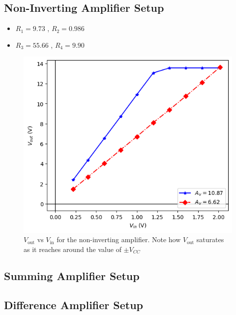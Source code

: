 \subsection{Non-Inverting Amplifier Setup}
    \begin{itemize}
        \item $R_{1}=9.73$ \kohm, $R_{2}=0.986$ \kohm
        \item $R_{3}=55.66$ \kohm, $R_{4}=9.90$ \kohm
    \end{itemize}
    
    \begin{figure}[H]
        \centering
        \includegraphics[width=1\columnwidth]{images/gb.png}
        \caption{$V_\text{out}$ vs $V_\text{in}$ for the non-inverting amplifier. Note how $V_\text{out}$ saturates as it reaches around the value of $\pm V_{CC}$}
        \label{g2}
    \end{figure}

\subsection{Summing Amplifier Setup}
    

\subsection{Difference Amplifier Setup}
    

